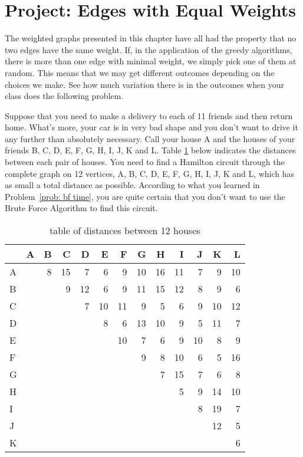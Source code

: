 \newpage


\section{Project:  Edges with Equal Weights}

The weighted graphs presented in this chapter have all had the property that no two edges have the same weight.  If, in the application of the greedy algorithms, there is more than one edge with minimal weight, we simply pick one of them at random.  This means that we may get different outcomes depending on the choices we make.  See how much variation there is in the outcomes when your class does the following problem.

\begin{prb}\label{prob:friends}
Suppose that you need to make a delivery to each of 11 friends and then return home.  What's more, your car is in very bad shape and you don't want to drive it any further than absolutely necessary.  Call your house A and the houses of your friends B, C, D, E, F, G, H, I, J, K and L. Table \ref{table} below indicates the distances between each pair of houses.  You need to find a Hamilton circuit through the complete graph on 12 vertices, A, B, C, D, E, F, G, H, I, J, K and L, which has as small a total distance as possible. According to what you learned in Problem~\ref{prob: bf time}, you are quite certain that you don't want to use the Brute Force Algorithm to find this circuit.
\end{prb}

\begin{table}[H]
 \begin{center}
  \begin{tabular}{|| l | r | r | r | r | r | r | r | r | r | r | r | r ||}
  \hline
     & A & B & C & D & E & F & G & H & I & J & K & L \\ \hline
   A &   & 8 &15 & 7 & 6 & 9 &10 &16 &11 & 7 & 9 &10 \\ \hline
   B &   &   & 9 &12 & 6 & 9 &11 &15 &12 & 8 & 9 & 6 \\ \hline
   C &   &   &   & 7 &10 &11 & 9 & 5 & 6 & 9 &10 &12 \\ \hline
   D &   &   &   &   & 8 & 6 &13 &10 & 9 & 5 &11 & 7 \\ \hline
   E &   &   &   &   &   &10 & 7 & 6 & 9 &10 & 8 & 9 \\ \hline
   F &   &   &   &   &   &   & 9 & 8 &10 & 6 & 5 &16 \\ \hline
   G &   &   &   &   &   &   &   & 7 &15 & 7 & 6 & 8 \\ \hline
   H &   &   &   &   &   &   &   &   & 5 & 9 &14 &10 \\ \hline
   I &   &   &   &   &   &   &   &   &   & 8 &19 & 7 \\ \hline
   J &   &   &   &   &   &   &   &   &   &   &12 & 5 \\ \hline
   K &   &   &   &   &   &   &   &   &   &   &   & 6 \\ \hline
  \end{tabular}
  \caption{table of distances between 12 houses}
  \label{table}
 \end{center}
\end{table}

